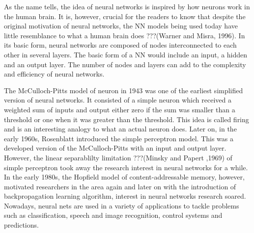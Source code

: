 As the name tells, the idea of neural networks is inspired by how neurons work in the human brain. It is, however, crucial for the readers to know that despite the original motivation of neural networks, the NN models being used today have little resemblance to what a human brain does ???(Warner and Misra, 1996).  In its basic form, neural networks are composed of nodes interconnected to each other in several layers. The basic form of a NN would include an input, a hidden and an output layer. The number of nodes and layers can add to the complexity and efficiency of neural networks.  

The McCulloch-Pitts model of neuron in 1943 was one of the earliest simplified version of neural networks. It consisted of a simple neuron which received a weighted sum of inputs and output either zero if the sum was smaller than a threshold or one when it was greater than the threshold. This idea is called firing and is an interesting analogy to what an actual neuron does. Later on, in the early 1960s, Rosenblatt introduced the simple perceptron model. This was a developed version of the McCulloch-Pitts with an input and output layer. However, the linear separablilty limitation ???(Minsky and Papert ,1969) of simple perceptron took away the research interest in neural networks for a while. In the early 1980s, the Hopfield model of content-addressable memory, however, motivated researchers in the area again and later on with the introduction of backpropagation learning algorithm, interest in neural networks research soared. Nowadays, neural nets are used in a variety of applications to tackle problems such as classification, speech and image recognition, control systems and predictions.

